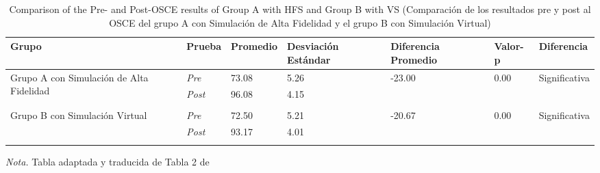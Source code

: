 \begin{table}[H]
   \caption{Comparison of the Pre- and Post-OSCE results of Group A with HFS and Group B with VS (Comparación de los resultados pre y post al OSCE del grupo A con Simulación de Alta Fidelidad y el grupo B con Simulación Virtual)}
   \label{tab:tabla-enfermeros}
   \begin{center}
      \begin{tabular}{ p{3cm} p{1cm} p{2cm} p{2cm} p{2cm} p{1cm} p{1cm} }
         \hline
         Grupo & Prueba & Promedio & Desviación Estándar & Diferencia Promedio & Valor-p & Diferencia \\
         \hline
         \multirow{2}{3cm}{Grupo A con Simulación de Alta Fidelidad} & \textit{Pre}  & 73.08 & 5.26 & -23.00 & 0.00 & Significativa \\
                                             & \textit{Post} & 96.08 & 4.15 & ~      & ~    & ~            \\
                                             \\
         \multirow{2}{3cm}{Grupo B con Simulación Virtual}  & \textit{Pre}  & 72.50 & 5.21 & -20.67 & 0.00 & Significativa \\
                                             & \textit{Post} & 93.17 & 4.01 \\
                                             \\
         \hline
      \end{tabular}
   \end{center}
   \textit{Nota.} Tabla adaptada y traducida de Tabla 2 de \cite{GUERRERO2022100002}
\end{table}
